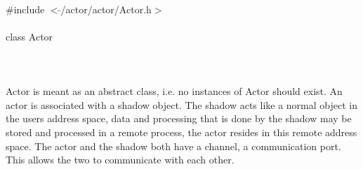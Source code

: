 
   \\
\indent \#include $<\tilde{ }$/actor/actor/Actor.h$>$  \\

  \\
\indent class Actor \\

 \\
 \\

  \\
\indent Actor is meant as an abstract class, i.e. no instances of Actor
should exist. An actor is associated with a shadow object. The shadow
acts like a normal object in the users address space, data and
processing that is done by the shadow may be stored and processed in a
remote process, the actor resides in this remote address space. The
actor and the shadow both have a channel, a communication port. This
allows the two to communicate with each other.\\

